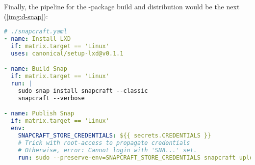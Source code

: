 Finally, the pipeline for the -package build and distribution would be the next  (\cref{img:d-snap}):

\begin{lstlisting}[language=yaml]
# ./snapcraft.yaml
- name: Install LXD
  if: matrix.target == 'Linux'
  uses: canonical/setup-lxd@v0.1.1

- name: Build Snap
  if: matrix.target == 'Linux'
  run: |
    sudo snap install snapcraft --classic
    snapcraft --verbose

- name: Publish Snap
  if: matrix.target == 'Linux'
  env:
    SNAPCRAFT_STORE_CREDENTIALS: ${{ secrets.CREDENTIALS }}
    # Trick with root-access to propagate credentials
    # Otherwise, error: Cannot login with 'SNA...' set.
    run: sudo --preserve-env=SNAPCRAFT_STORE_CREDENTIALS snapcraft upload *.snap --release=latest/stable
\end{lstlisting}

